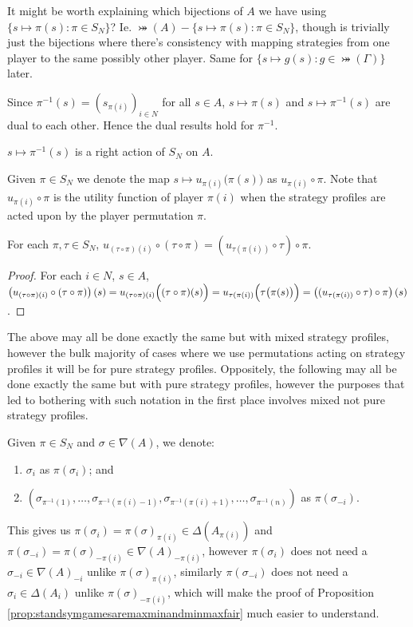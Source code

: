 It might be worth explaining which bijections of $A$ we have using $\{s\mapsto\pi(s): \pi \in S_N\}$? Ie. $\bij(A)-\{s\mapsto\pi(s): \pi \in S_N\}$, though is trivially just the bijections where there's consistency with mapping strategies from one player to the same possibly other player. Same for $\{s\mapsto g(s): g \in \bij(\Gamma)\}$ later. 

Since $\pi^{-1}(s) = (s_{\pi(i)})_{i \in N}$ for all $s \in A$, $s \mapsto \pi(s)$ and $s \mapsto \pi^{-1}(s)$ are dual to each other. Hence the dual results hold for $\pi^{-1}$.

\begin{lemma} 
	$s \mapsto \pi^{-1}(s)$ is a right action of $S_N$ on $A$.
\end{lemma}

Given $\pi \in S_N$ we denote the map $s \mapsto u_{\pi(i)}\bigl(\pi(s)\bigr)$ as $u_{\pi(i)} \circ \pi$. Note that $u_{\pi(i)} \circ \pi$ is the utility function of player $\pi(i)$ when the strategy profiles are acted upon by the player permutation $\pi$.

\begin{corollary} \label{utilityactionprop}
	For each $\pi, \tau \in S_N$, $u_{(\tau \circ \pi)(i)} \circ (\tau \circ \pi) = (u_{\tau(\pi(i))} \circ \tau) \circ \pi$.
	\begin{proof}
		For each $i \in N$, $s \in A$, $\left(u_{(\tau \circ \pi)(i)} \circ (\tau \circ \pi)\right)(s) = u_{(\tau \circ \pi)(i)}\Bigl((\tau \circ \pi)(s)\Bigr) = u_{\tau(\pi(i))}\Bigl(\tau\bigl(\pi(s)\bigr)\Bigr) = \left((u_{\tau(\pi(i))} \circ \tau) \circ \pi\right)(s)$.
	\end{proof}
\end{corollary}

The above may all be done exactly the same but with mixed strategy profiles, however the bulk majority of cases where we use permutations acting on strategy profiles it will be for pure strategy profiles. Oppositely, the following may all be done exactly the same but with pure strategy profiles, however the purposes that led to bothering with such notation in the first place involves mixed not pure strategy profiles. 

Given $\pi \in S_N$ and $\sigma \in \nabla(A)$, we denote:
\begin{enumerate}
	\item $\sigma_i$ as $\pi(\sigma_i)$; and
	\item $(\sigma_{\pi^{-1}(1)}, \ldots, \sigma_{\pi^{-1}\left(\pi(i)-1\right)}, \sigma_{\pi^{-1}\left(\pi(i)+1\right)}, \ldots, \sigma_{\pi^{-1}(n)})$ as $\pi(\sigma_{-i})$.
\end{enumerate}
This gives us $\pi(\sigma_i) = \pi(\sigma)_{\pi(i)} \in \Delta(A_{\pi(i)})$ and $\pi(\sigma_{-i}) = \pi(\sigma)_{-\pi(i)} \in {\nabla(A)}_{-\pi(i)}$, however $\pi(\sigma_i)$ does not need a $\sigma_{-i} \in {\nabla(A)}_{-i}$ unlike $\pi(\sigma)_{\pi(i)}$, similarly $\pi(\sigma_{-i})$ does not need a $\sigma_i \in \Delta(A_i)$ unlike $\pi(\sigma)_{-\pi(i)}$, which will make the proof of Proposition \ref{prop:standsymgamesaremaxminandminmaxfair} much easier to understand.

